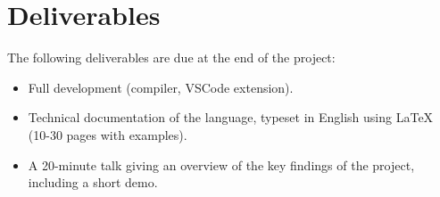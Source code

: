 \documentclass{proposal}
\begin{document}
\section{Deliverables}\label{sec:deliverables}


The following deliverables are due at the end of the project:
\begin{itemize}
    \item Full development (compiler, VSCode extension).
    \item Technical documentation of the language, typeset in English using LaTeX (10-30 pages with examples).
    \item A 20-minute talk giving an overview of the key findings of the project, including a short demo.
\end{itemize}


{%
\small


}
\end{document}
